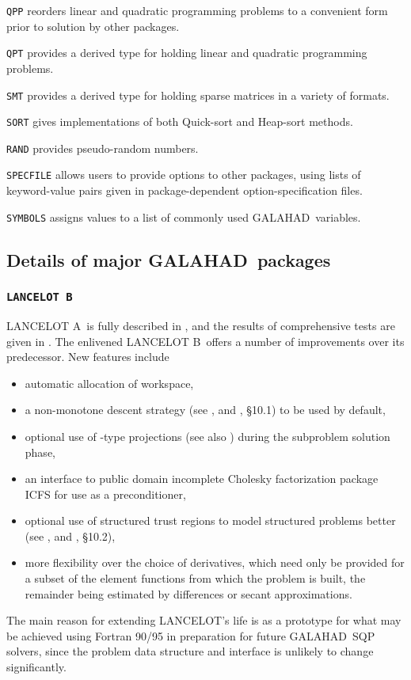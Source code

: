 \documentclass[twoside]{article}
\newcommand{\gal}{{\sf GALAHAD}}
\newcommand{\lan}{{\sf LANCELOT}}
\newcommand{\lana}{{\sf LANCELOT A}}
\newcommand{\lanb}{{\sf LANCELOT B}}
\renewcommand{\itt}[1]{\item{{\tt #1}}}
\begin{document}
\begin{description}

\itt{QPP} reorders linear and quadratic programming
problems to a convenient form prior to solution by other packages.

\itt{QPT} provides a derived type for holding linear and quadratic programming
problems.

\itt{SMT} provides a derived type for holding sparse matrices in a variety of
formats.

\itt{SORT} gives implementations of both Quick-sort and Heap-sort methods.

\itt{RAND} provides pseudo-random numbers.

\itt{SPECFILE} allows users to provide options to other packages, using lists
of keyword-value pairs given in package-dependent option-specification files.

\itt{SYMBOLS} assigns values to a list of commonly used \gal\ variables.

\end{description}

\subsection{Details of major \gal\ packages\label{major}}

\subsubsection{{\tt LANCELOT B}\label{lanb}}

\lana\ is fully described in , and the results
of comprehensive tests are given in .
The enlivened \lanb\ offers a number of improvements over its predecessor.
New features include
\begin{itemize}
\item automatic allocation of workspace,
\item a non-monotone descent strategy (see , and
, \S10.1) to be used by default,
\item optional use of -type projections
   (see also )
   during the subproblem solution phase,
\item an interface to  public domain incomplete Cholesky
   factorization package ICFS for use as a preconditioner,
\item optional use of structured trust regions to model
   structured problems better (see , and
   , \S10.2),
\item more flexibility over the choice of derivatives, which need
   only be provided for a subset of the element functions from which the
   problem is built, the remainder being estimated by differences or secant
   approximations.
\end{itemize}
The main reason for extending \lan's life is as a prototype
for what may be achieved using Fortran 90/95 in preparation for
future \gal\ SQP solvers, since the problem data structure and
interface is unlikely to change significantly.
\end{document}
